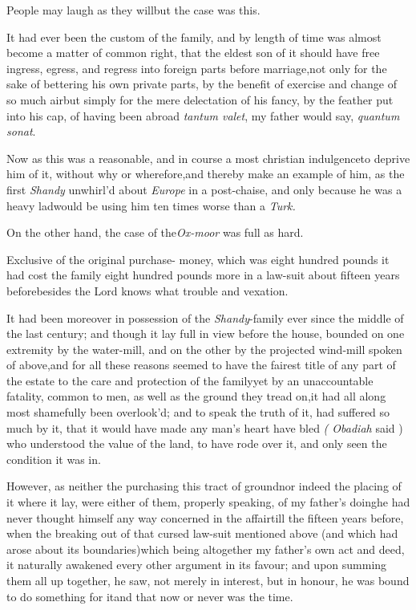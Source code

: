 \documentclass[twoside]{article}
\begin{document}
\tsk People may laugh as they will\tsh but the case
was this.

It had ever been the custom of the family, and by length of time
was almost become a matter of common right, that the eldest son of
it should have free ingress, egress, and regress into foreign parts
before marriage,\tsk not only for the sake of bettering his own
private parts, by the benefit of exercise and change of so much
air\tsk but simply for the mere delectation of his fancy, by the
feather
put into his cap, of having been abroad\break
\tsk \textit{tantum valet}, my father would say,
\textit{quantum sonat}.

Now as this was a reasonable, and in course a most christian
indulgence\tsh to deprive him of it, without why or\break
wherefore,\tsh and thereby make an example of him, as the
first \textit{Shandy} unwhirl’d about \textit{Europe} in a
post-chaise, and only because he was a heavy lad\tsh would
be using him ten times worse than a \textit{Turk.}

On the other hand, the case of the\break \textit{Ox-moor} was full as
hard.

Exclusive of the original purchase-\break
money, which was eight hundred pounds\break
\tsk it had cost the family eight hundred
pounds more in a law-suit about fifteen
years before\tsk besides the Lord knows what trouble and vexation.

It had been moreover in possession of the \textit{Shandy}-family
ever since the middle of the last century; and though it lay full
in view before the house, bounded on one extremity by the
water-mill, and on the other by the projected wind-mill
spoken of above,\tsk and for all these reasons
seemed to have the fairest title of any part of the estate to the
care and protection of the family\tsk yet by an unaccountable
fatality, common to men, as well as the ground they tread
on,\tsk it had all along most shamefully been
overlook’d; and to speak the truth of it, had suffered so
much by it, that it would have made any man’s heart have bled
\sic\textit{( Obadiah} said ) who understood the value of the land, to have
rode over it, and only seen the condition it was in.

However, as neither the purchasing this tract of
ground\tsk nor indeed the placing of it where it lay, were either
of them, properly speaking, of my father’s
doing\tsk he had never thought himself any way concerned
in the affair\tsk till the fifteen years before, when the
breaking out of that cursed law-suit mentioned above (and which had
arose about its boundaries)\tsk which being altogether my
father’s own act and deed, it naturally awakened every other
argument in its favour; and upon summing them all up
together, he saw, not merely in interest, but in honour, he was
bound to do something for it\tsk and that now or never was
the time.
\end{document}
